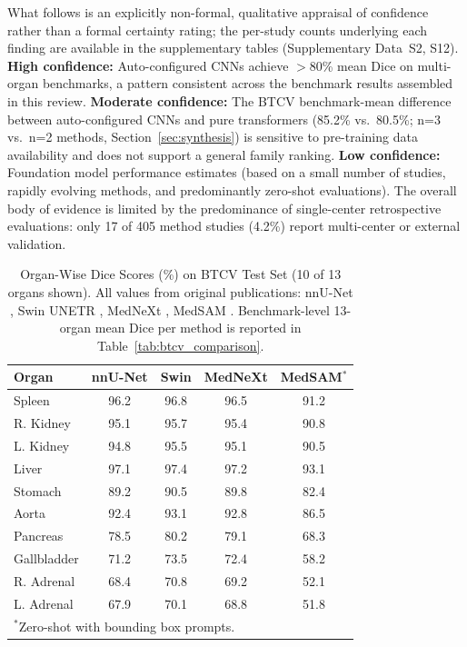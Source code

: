 What follows is an explicitly non-formal, qualitative appraisal of confidence rather than a formal certainty rating; the per-study counts underlying each finding are available in the supplementary tables (Supplementary Data~S2, S12). \textbf{High confidence:} Auto-configured CNNs achieve $>$80\% mean Dice on multi-organ benchmarks, a pattern consistent across the benchmark results assembled in this review. \textbf{Moderate confidence:} The BTCV benchmark-mean difference between auto-configured CNNs and pure transformers (85.2\% vs.\ 80.5\%; n=3 vs.\ n=2 methods, Section~\ref{sec:synthesis}) is sensitive to pre-training data availability and does not support a general family ranking. \textbf{Low confidence:} Foundation model performance estimates (based on a small number of studies, rapidly evolving methods, and predominantly zero-shot evaluations). The overall body of evidence is limited by the predominance of single-center retrospective evaluations: only 17 of 405 method studies (4.2\%) report multi-center or external validation.

\begin{table}[!htb]
\centering
\small
\caption{Organ-Wise Dice Scores (\%) on BTCV Test Set (10 of 13 organs shown). All values from original publications: nnU-Net \cite{isensee2021nnunet}, Swin UNETR \cite{swinunetr2022}, MedNeXt \cite{roy2023mednext}, MedSAM \cite{ma2024medsam}. Benchmark-level 13-organ mean Dice per method is reported in Table~\ref{tab:btcv_comparison}.}
\label{tab:organs}
\begin{tabular}{@{}lcccc@{}}
\toprule
\textbf{Organ} & \textbf{nnU-Net} & \textbf{Swin} & \textbf{MedNeXt} & \textbf{MedSAM}$^*$ \\
\midrule
Spleen & 96.2 & 96.8 & 96.5 & 91.2 \\
R. Kidney & 95.1 & 95.7 & 95.4 & 90.8 \\
L. Kidney & 94.8 & 95.5 & 95.1 & 90.5 \\
Liver & 97.1 & 97.4 & 97.2 & 93.1 \\
Stomach & 89.2 & 90.5 & 89.8 & 82.4 \\
Aorta & 92.4 & 93.1 & 92.8 & 86.5 \\
Pancreas & 78.5 & 80.2 & 79.1 & 68.3 \\
Gallbladder & 71.2 & 73.5 & 72.4 & 58.2 \\
R. Adrenal & 68.4 & 70.8 & 69.2 & 52.1 \\
L. Adrenal & 67.9 & 70.1 & 68.8 & 51.8 \\
\bottomrule
\multicolumn{5}{l}{\footnotesize $^*$Zero-shot with bounding box prompts.}
\end{tabular}
\end{table}

